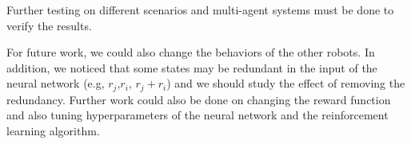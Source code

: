 \documentclass[conference]{IEEEtran}
\begin{document}
Further testing on different scenarios and multi-agent systems must be done to verify the results. 

For future work, we could also change the behaviors of the other robots. In addition, we noticed that some states may be redundant in the input of the neural network (e.g, $ r_j $,$ r_i $, $r_j+r_i$) and we should study the effect of removing the redundancy. Further work could also be done on changing the reward function and also tuning hyperparameters of the neural network and the reinforcement learning algorithm.



\end{document}
